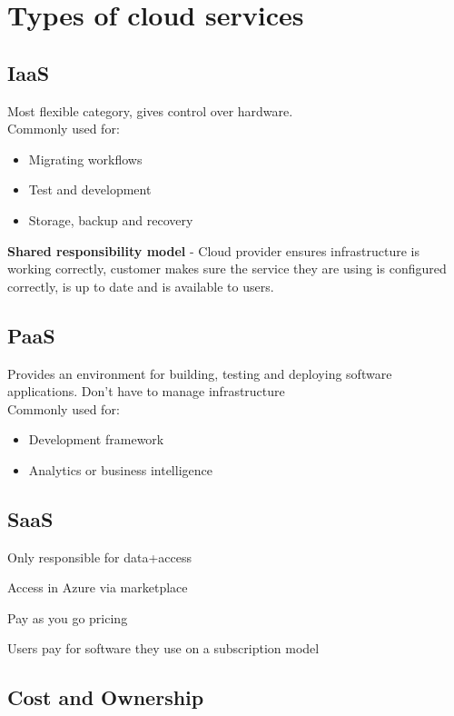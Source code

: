 \documentclass{article}[18pt]
\begin{document}
\hypertarget{types-of-cloud-services}{%
	\section{Types of cloud services}\label{types-of-cloud-services}}

\hypertarget{iaas}{%
	\subsection{IaaS}\label{iaas}}
Most flexible category, gives control over hardware.\\
Commonly used for:
\begin{itemize}
	\item Migrating workflows
	\item Test and development
	\item Storage, backup and recovery
\end{itemize}

\textbf{Shared responsibility model} - Cloud provider ensures infrastructure is working correctly, customer makes sure the service they are using is configured correctly, is up to date and is available to users.


\hypertarget{paas}{%
	\subsection{PaaS}\label{paas}}
Provides an environment for building, testing and deploying software applications. Don't have to manage infrastructure\\
Commonly used for:
\begin{itemize}
	\item Development framework
	\item Analytics or business intelligence
\end{itemize}



\hypertarget{saas}{%
	\subsection{SaaS}\label{saas}}

Only responsible for data+access

Access in Azure via marketplace

Pay as you go pricing

Users pay for software they use on a subscription model

\subsection{Cost and Ownership}
\end{document}
